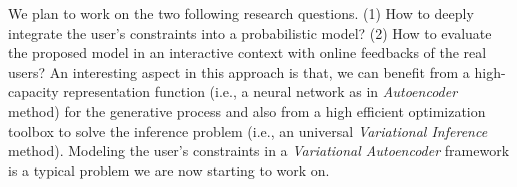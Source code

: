\documentclass[11pt, a4paper]{article}
\begin{document}
We plan to work on the two following research questions.
(1) How to deeply integrate the user's constraints into a probabilistic model?
(2) How to evaluate the proposed model in an interactive context with online feedbacks of the real users?
An interesting aspect in this approach is that, we can benefit from a high-capacity representation function (i.e., a neural network as in \emph{Autoencoder} method) for the generative process and also from a high efficient optimization toolbox to solve the inference problem (i.e., an universal \emph{Variational Inference} method).
Modeling the user's constraints in a \emph{Variational Autoencoder} framework is a typical problem we are now starting to work on.
\end{document}
